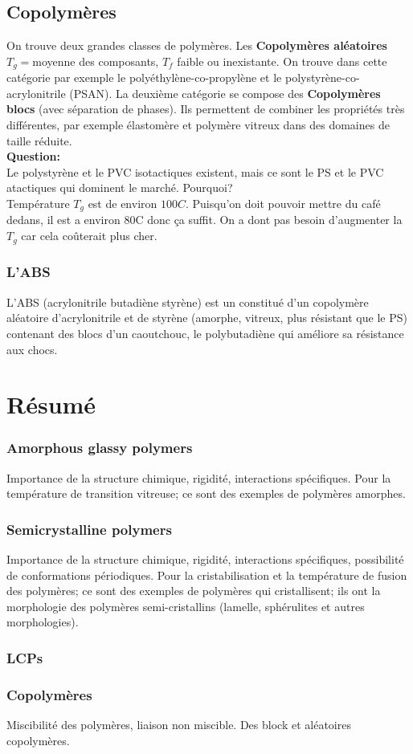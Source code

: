 \documentclass[../main.tex]{subfiles}
\begin{document}
	\subsection{Copolymères}
	On trouve deux grandes classes de polymères.
	Les \textbf{Copolymères aléatoires} $T_g = $moyenne des composants, $T_f$ faible ou inexistante. On trouve dans cette catégorie par exemple le polyéthylène-co-propylène et le polystyrène-co-acrylonitrile (PSAN). La deuxième catégorie se compose des \textbf{Copolymères blocs} (avec séparation de phases). Ils permettent de combiner les propriétés très différentes, par exemple élastomère et polymère vitreux dans des domaines de taille réduite. 
	\\\textbf{Question:} \\Le polystyrène et le PVC isotactiques existent, mais ce sont le PS et le PVC atactiques qui dominent le marché. Pourquoi? \\ Température $T_g$ est de environ $100 C$. Puisqu'on doit pouvoir mettre du café dedans, il est a environ 80C donc ça suffit. On a dont pas besoin d'augmenter la $T_g$ car cela coûterait plus cher.
	\subsubsection{L'ABS}
	L'ABS (acrylonitrile butadiène styrène) est un constitué d'un copolymère aléatoire d'acrylonitrile et de styrène (amorphe, vitreux, plus résistant que le PS) contenant des blocs d'un caoutchouc, le polybutadiène qui améliore sa résistance aux chocs. 
	\section{Résumé}
	\subsubsection{Amorphous glassy polymers}
	Importance de la structure chimique, rigidité, interactions spécifiques. Pour la température de transition vitreuse; ce sont des exemples de polymères amorphes. 
	\subsubsection{Semicrystalline polymers}
	Importance de la structure chimique, rigidité, interactions spécifiques, possibilité de conformations périodiques. Pour la cristabilisation et la température de fusion des polymères; ce sont des exemples de polymères qui cristallisent; ils ont la morphologie des polymères semi-cristallins (lamelle, sphérulites et autres morphologies).
	\subsubsection{LCPs}
	
	\subsubsection{Copolymères}
	Miscibilité des polymères, liaison non miscible. Des block et aléatoires copolymères. 
	 
\end{document}
